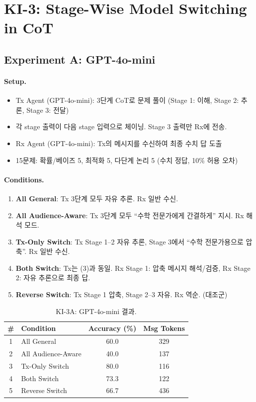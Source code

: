 \documentclass[11pt]{article}
\begin{document}
\section{KI-3: Stage-Wise Model Switching in CoT}

\subsection{Experiment A: GPT-4o-mini}

\paragraph{Setup.}
\begin{itemize}[nosep]
  \item Tx Agent (GPT-4o-mini): 3단계 CoT로 문제 풀이 (Stage 1: 이해, Stage 2: 추론, Stage 3: 전달)
  \item 각 stage 출력이 다음 stage 입력으로 체이닝. Stage 3 출력만 Rx에 전송.
  \item Rx Agent (GPT-4o-mini): Tx의 메시지를 수신하여 최종 수치 답 도출
  \item 15문제: 확률/베이즈 5, 최적화 5, 다단계 논리 5 (수치 정답, 10\% 허용 오차)
\end{itemize}

\paragraph{Conditions.}
\begin{enumerate}[nosep]
  \item \textbf{All General}: Tx 3단계 모두 자유 추론. Rx 일반 수신.
  \item \textbf{All Audience-Aware}: Tx 3단계 모두 ``수학 전문가에게 간결하게'' 지시. Rx 해석 모드.
  \item \textbf{Tx-Only Switch}: Tx Stage 1--2 자유 추론, Stage 3에서 ``수학 전문가용으로 압축''. Rx 일반 수신.
  \item \textbf{Both Switch}: Tx는 (3)과 동일. Rx Stage 1: 압축 메시지 해석/검증, Rx Stage 2: 자유 추론으로 최종 답.
  \item \textbf{Reverse Switch}: Tx Stage 1 압축, Stage 2--3 자유. Rx 역순. (대조군)
\end{enumerate}

\begin{table}[h]
\centering
\caption{KI-3A: GPT-4o-mini 결과.}
\begin{tabular}{clcc}
\toprule
\# & Condition & Accuracy (\%) & Msg Tokens \\
\midrule
1 & All General        & 60.0  & 329 \\
2 & All Audience-Aware & 40.0  & 137 \\
3 & Tx-Only Switch     & 80.0 &  116 \\
4 & Both Switch        & 73.3 & 122 \\
5 & Reverse Switch     & 66.7  & 436 \\
\bottomrule
\end{tabular}
\end{table}
\end{document}

